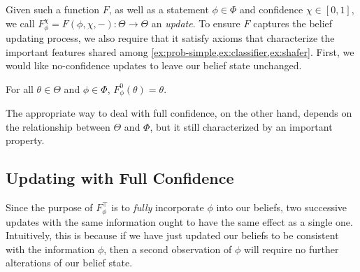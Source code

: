 Given such a function $F$, as well as a statement $\phi \in \Phi$
and confidence $\chi \in [0,1]$, we call 
$F^\chi_\phi = F(\phi, \chi, -) : \Theta \to \Theta$
an \emph{update}.
To ensure $F$ captures the belief updating process, we also require that it satisfy axioms
that characterize the important features shared among \cref{ex:prob-simple,ex:classifier,ex:shafer}.
First, we would like no-confidence updates to leave our belief state unchanged. 

\begin{CFaxioms}
	\item
		For all $\theta \in \Theta$ and $\phi \in \Phi$,
		 $F^{0}_\phi(\theta) = \theta$.
		\label{ax:zero}
\end{CFaxioms}


The appropriate way to deal with full confidence, on the other hand,
depends on the relationship between $\Theta$ and $\Phi$,
but it still characterized by an important property.


\subsection{Updating with Full Confidence}
Since the purpose of
$F^\top_\phi$
is to \emph{fully} incorporate $\phi$ into our beliefs,
two successive updates with the same information ought to have the same effect as a single one.
Intuitively, this is because if we have just updated our beliefs to be consistent with the information $\phi$, then a second observation of $\phi$ will require no further alterations of our belief state.

